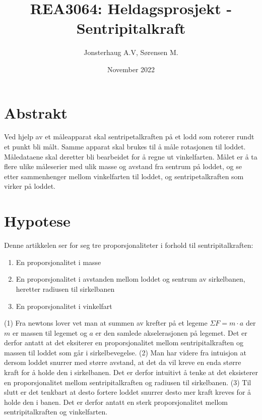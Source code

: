 \documentclass{article}
\title{REA3064: Heldagsprosjekt - Sentripitalkraft}
\author{Jonsterhaug A.V, Sørensen M.}
\date{November 2022}
\begin{document}
\maketitle

\tableofcontents
\newpage

\section{Abstrakt}
Ved hjelp av et måleapparat skal sentripetalkraften på et lodd som roterer rundt et punkt bli målt. 
Samme apparat skal brukes til å måle rotasjonen til loddet. Måledataene skal deretter bli bearbeidet 
for å regne ut vinkelfarten. Målet er å ta flere ulike måleserier med ulik masse og avstand fra sentrum på loddet, 
og se etter sammenhenger mellom vinkelfarten til loddet, og sentripetalkraften som virker på loddet.

\section{Hypotese}
Denne artikkelen ser for seg tre proporsjonaliteter i forhold til sentripitalkraften:

\begin{enumerate}
    \item En proporsjonalitet i masse
    \item En proporsjonalitet i avstanden mellom loddet og sentrum av sirkelbanen, heretter radiusen til sirkelbanen
    \item En proporsjonalitet i vinkelfart
\end{enumerate}

\noindent(1) Fra newtons lover vet man at summen av krefter på et legeme $\Sigma F = m\cdot a$ der $m$ er massen til legemet og $a$ er 
den samlede akselerasjonen på legemet. Det er derfor antatt at det eksiterer en proporsjonalitet mellom 
sentripitalkraften og massen til loddet som går i sirkelbevegelse. (2) Man har videre fra intuisjon at dersom 
loddet snurrer med større avstand, at det da vil kreve en enda større kraft for å holde den i sirkelbanen. Det er derfor intuitivt 
å tenke at det eksisterer en proporsjonalitet mellom sentripitalkraften og radiusen til sirkelbanen.
(3) Til slutt er det tenkbart at desto fortere loddet snurrer desto mer kraft kreves for å holde den i banen. 
Det er derfor antatt en sterk proporsjonalitet mellom sentripitalkraften og vinkelfarten.
\end{document}
